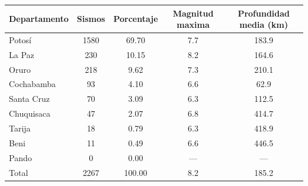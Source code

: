 \begin{tabular}{lcccc}
\toprule
Departamento & Sismos & Porcentaje & Magnitud maxima & Profundidad media (km) \\
\midrule
Potosí & 1580 & 69.70 & 7.7 & 183.9 \\
La Paz & 230 & 10.15 & 8.2 & 164.6 \\
Oruro & 218 & 9.62 & 7.3 & 210.1 \\
Cochabamba & 93 & 4.10 & 6.6 & 62.9 \\
Santa Cruz & 70 & 3.09 & 6.3 & 112.5 \\
Chuquisaca & 47 & 2.07 & 6.8 & 414.7 \\
Tarija & 18 & 0.79 & 6.3 & 418.9 \\
Beni & 11 & 0.49 & 6.6 & 446.5 \\
Pando & 0 & 0.00 & — & — \\
Total & 2267 & 100.00 & 8.2 & 185.2 \\
\bottomrule
\end{tabular}